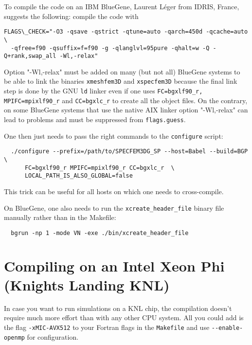 \noindent
To compile the code on an IBM BlueGene, Laurent L\'eger from IDRIS, France, suggests the following: compile the code with
{\small
\begin{verbatim}
FLAGS\_CHECK="-O3 -qsave -qstrict -qtune=auto -qarch=450d -qcache=auto \
  -qfree=f90 -qsuffix=f=f90 -g -qlanglvl=95pure -qhalt=w -Q -Q+rank,swap_all -Wl,-relax"
\end{verbatim}
}

\noindent
Option "-Wl,-relax" must be added on many (but not all) BlueGene systems to be able to link the binaries \texttt{xmeshfem3D}
and \texttt{xspecfem3D} because the final link step is done by the GNU \texttt{ld} linker even if
one uses \texttt{FC=bgxlf90\_r, MPIFC=mpixlf90\_r} and \texttt{CC=bgxlc\_r} to create all the object files.
On the contrary, on some BlueGene systems that use the native AIX linker option "-Wl,-relax" can lead to problems and must be suppressed from \texttt{flags.guess}.

\noindent
One then just needs to pass the right commands to the \texttt{configure} script:
{\small
\begin{verbatim}
  ./configure --prefix=/path/to/SPECFEM3DG_SP --host=Babel --build=BGP \
      FC=bgxlf90_r MPIFC=mpixlf90_r CC=bgxlc_r  \
      LOCAL_PATH_IS_ALSO_GLOBAL=false
\end{verbatim}
}

\noindent
This trick can be useful for all hosts on which one needs to cross-compile.

\noindent
On BlueGene, one also needs to run the \texttt{xcreate\_header\_file} binary file manually rather than in the Makefile:
{\small
\begin{verbatim}
  bgrun -np 1 -mode VN -exe ./bin/xcreate_header_file
\end{verbatim}
}


\section{Compiling on an Intel Xeon Phi (Knights Landing KNL)}

\noindent
In case you want to run simulations on a KNL chip, the compilation doesn't require much more effort than with any other CPU system.
All you could add is the flag \texttt{-xMIC-AVX512} to your Fortran flags in the \texttt{Makefile} and use \texttt{-{}-enable-openmp} for configuration.

